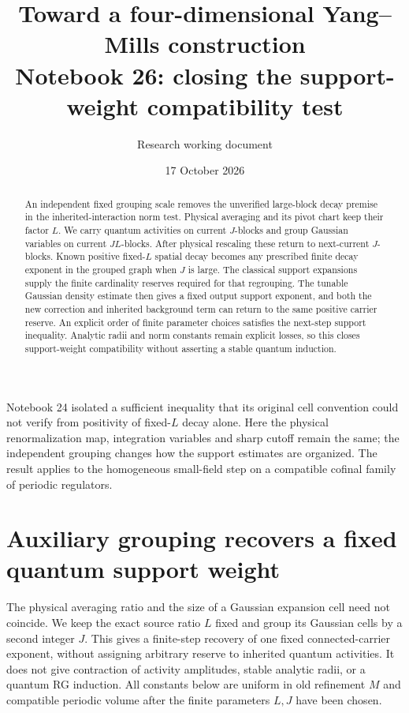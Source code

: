 \documentclass[11pt]{article}
\title{Toward a four-dimensional Yang--Mills construction\\
\large Notebook 26: closing the support-weight compatibility test}
\author{Research working document}
\date{17 October 2026}
\theoremstyle{remark}
\begin{document}
\maketitle
\begin{abstract}
An independent fixed grouping scale removes the unverified
large-block decay premise in the inherited-interaction norm
test. Physical averaging and its pivot chart keep their
factor $L$. We carry quantum activities on current $J$-blocks
and group Gaussian variables on current $JL$-blocks. After
physical rescaling these return to next-current $J$-blocks.
Known positive fixed-$L$ spatial decay becomes any prescribed
finite decay exponent in the grouped graph when $J$ is large.
The classical support expansions supply the finite cardinality
reserves required for that regrouping. The tunable Gaussian
density estimate then gives a fixed output support exponent,
and both the new correction and inherited background term
can return to the same positive carrier reserve.
An explicit order of finite parameter choices satisfies the
next-step support inequality. Analytic radii and norm constants
remain explicit losses, so this closes support-weight
compatibility without asserting a stable quantum induction.
\end{abstract}

Notebook 24 isolated a sufficient inequality that its original
cell convention could not verify from positivity of fixed-$L$
decay alone. Here the physical renormalization map, integration
variables and sharp cutoff remain the same; the independent
grouping changes how the support estimates are organized.
The result applies to the homogeneous small-field step on a
compatible cofinal family of periodic regulators.


\section{Auxiliary grouping recovers a fixed quantum support weight}
\label{ag-section}

The physical averaging ratio and the size of a Gaussian expansion
cell need not coincide. We keep the exact source ratio $L$ fixed
and group its Gaussian cells by a second integer $J$. This gives
a finite-step recovery of one fixed connected-carrier exponent,
without assigning arbitrary reserve to inherited quantum activities.
It does not give contraction of activity amplitudes, stable analytic
radii, or a quantum RG induction. All constants below are uniform
in old refinement $M$ and compatible periodic volume after the
finite parameters $L,J$ have been chosen.
\end{document}
